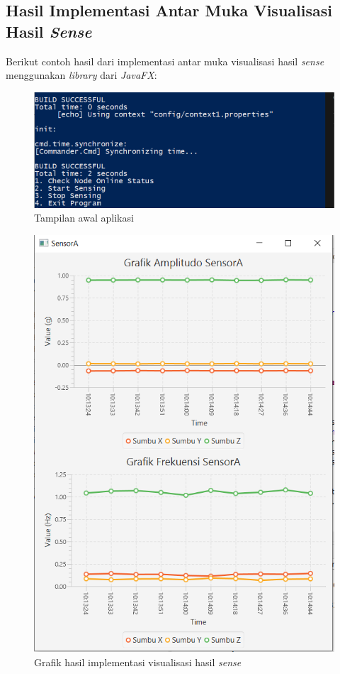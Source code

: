 \subsection{Hasil Implementasi Antar Muka Visualisasi Hasil \textit{Sense}}
Berikut contoh hasil dari implementasi antar muka visualisasi hasil \textit{sense} menggunakan \textit{library} dari \textit{JavaFX}:
\begin{figure}[H] 
	\centering  
	\includegraphics[scale=1]{Gambar/Hasil Sensing/visualisasi.PNG}
	\caption[Tampilan awal aplikasi]{Tampilan awal aplikasi}
	\label{fig:tampilan awal} 
\end{figure}

\begin{figure}[H] 
	\centering  
	\includegraphics[scale=1]{Lampiran/HasilPengujian/sensorA_starRooftop.PNG}
	\caption[Grafik hasil implementasi visualisasi hasil \textit{sense}]{Grafik hasil implementasi visualisasi hasil \textit{sense}}
	\label{fig:tampilan_sensing} 
\end{figure}

